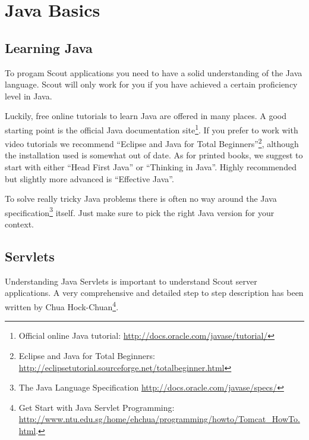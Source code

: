 \documentclass[a4paper,10pt,twoside]{book}
\begin{document}
  \sloppy
\fi


\chapter{Java Basics}

\section{Learning Java}

To progam Scout applications you need to have a solid understanding of the Java language.
Scout will only work for you if you have achieved a certain proficiency level in Java. 

Luckily, free online tutorials to learn Java are offered in many places.
A good starting point is the official Java documentation 
site\footnote{Official online Java tutorial: \url{http://docs.oracle.com/javase/tutorial/}}.
If you prefer to work with video tutorials we recommend ``Eclipse and Java for Total 
Beginners''\footnote{Eclipse and Java for Total Beginners: \url{http://eclipsetutorial.sourceforge.net/totalbeginner.html}}, 
although the installation used is somewhat out of date.
As for printed books, we suggest to start with either ``Head First Java''\cite{batessierra05} or ``Thinking in Java''\cite{eckel06}.
Highly recommended but slightly more advanced is ``Effective Java''\cite{bloch08}.

To solve really tricky Java problems there is often no way around the Java 
specification\footnote{The Java Language Specification \url{http://docs.oracle.com/javase/specs/}} itself.
Just make sure to pick the right Java version for your context.


\section{Servlets}

Understanding Java Servlets is important to understand Scout server applications.
A very comprehensive and detailed step to step description has been written by Chua Hock-Chuan\footnote{
Get Start with Java Servlet Programming: \url{http://www.ntu.edu.sg/home/ehchua/programming/howto/Tomcat_HowTo.html}.
}.


\ifx\wholebook\relax\else
   
   
\end{document}
